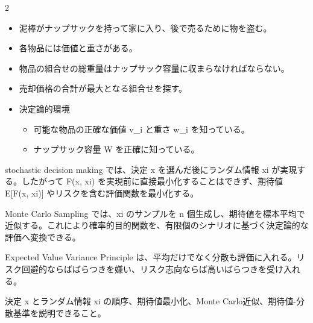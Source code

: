 \begin{multicols}{2}

\footnotesize

\raggedcolumns


\begin{itemize}
\item 泥棒がナップサックを持って家に入り、後で売るために物を盗む。
\item 各物品には価値と重さがある。
\item 物品の組合せの総重量はナップサック容量に収まらなければならない。
\item 売却価格の合計が最大となる組合せを探す。
\item 決定論的環境
\begin{itemize}
\item 可能な物品の正確な価値 v\_i と重さ w\_i を知っている。
\item ナップサック容量 W を正確に知っている。
\end{itemize}
\end{itemize}

stochastic decision making では、決定 x を選んだ後にランダム情報 xi が実現する。したがって F(x, xi) を実現前に直接最小化することはできず、期待値 E[F(x, xi)] やリスクを含む評価関数を最小化する。\par

Monte Carlo Sampling では、xi のサンプルを n 個生成し、期待値を標本平均で近似する。これにより確率的目的関数を、有限個のシナリオに基づく決定論的な評価へ変換できる。\par

Expected Value Variance Principle は、平均だけでなく分散も評価に入れる。リスク回避的ならばばらつきを嫌い、リスク志向ならば高いばらつきを受け入れる。\par

決定 x とランダム情報 xi の順序、期待値最小化、Monte Carlo近似、期待値-分散基準を説明できること。\par


\end{multicols}
